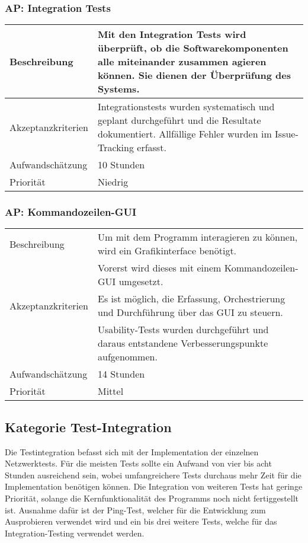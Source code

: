 \documentclass[
	ngerman,
	toc=listof, %
	toc=bibliography, %
	footnotes=multiple, %
	parskip=half, %
	numbers=noendperiod %
]{scrartcl}
\begin{document}
	\subsubsection{AP: Integration Tests}
	\begin{tabularx}{\textwidth}{lX}
		\toprule
		Beschreibung & Mit den Integration Tests wird überprüft, ob die Softwarekomponenten alle miteinander zusammen agieren können. Sie dienen der Überprüfung des Systems.\\
		\midrule
		Akzeptanzkriterien & Integrationstests wurden systematisch und geplant durchgeführt und die Resultate dokumentiert. Allfällige Fehler wurden im Issue-Tracking erfasst.\\
		\midrule
		Aufwandschätzung & 10 Stunden\\
		\midrule
		Priorität & Niedrig\\
		\bottomrule
	\end{tabularx}
	
	\subsubsection{AP: Kommandozeilen-GUI}
	\begin{tabularx}{\textwidth}{lX}
		\toprule
		Beschreibung & Um mit dem Programm interagieren zu können, wird ein Grafikinterface benötigt.\\
		 & Vorerst wird dieses mit einem Kommandozeilen-GUI umgesetzt.\\
		\midrule
		Akzeptanzkriterien & Es ist möglich, die Erfassung, Orchestrierung und Durchführung über das GUI zu steuern.\\
		 & Usability-Tests wurden durchgeführt und daraus entstandene Verbesserungspunkte aufgenommen.\\
		\midrule
		Aufwandschätzung & 14 Stunden\\
		\midrule
		Priorität & Mittel \\
		\bottomrule
	\end{tabularx}
	\newpage

	

	\subsection{Kategorie Test-Integration}
	Die Testintegration befasst sich mit der Implementation der einzelnen Netzwerktests. 
	Für die meisten Tests sollte ein Aufwand von vier bis acht Stunden ausreichend sein, wobei umfangreichere Tests durchaus mehr Zeit für die Implementation benötigen können.
	Die Integration von weiteren Tests hat geringe Priorität, solange die Kernfunktionalität des Programms noch nicht fertiggestellt ist. 
	Ausnahme dafür ist der Ping-Test, welcher für die Entwicklung zum Ausprobieren verwendet wird und ein bis drei weitere Tests, welche für das Integration-Testing verwendet werden.
\end{document}
